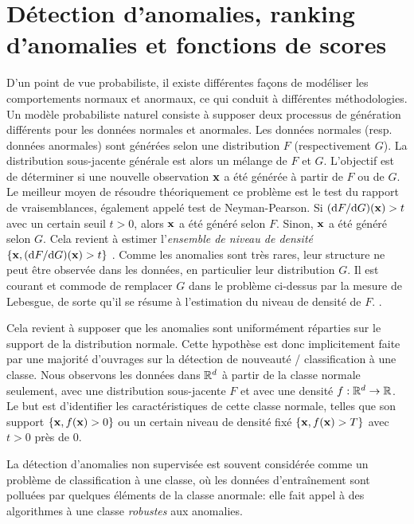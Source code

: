 \section{Détection d'anomalies, ranking d'anomalies et fonctions de scores}
\label{resume_fr:scoring_function}
D'un point de vue probabiliste, il existe différentes façons de modéliser les comportements normaux et anormaux, ce qui conduit à différentes méthodologies. Un modèle probabiliste naturel consiste à supposer deux processus de génération différents pour les données normales et anormales. Les données normales (resp. données anormales) sont générées selon une distribution $F$ (respectivement $G$). La distribution sous-jacente générale est alors un mélange de $F$ et $G$. L'objectif est de déterminer si une nouvelle observation $ \mathbf x $ a été générée à partir de $ F $ ou de $ G $. Le meilleur moyen de résoudre théoriquement ce problème est le test du rapport de vraisemblances, également appelé test de Neyman-Pearson. Si $ (\mathrm{d} F / \mathrm{d} G) (\mathbf x)> t $ avec un certain seuil $ t> 0 $, alors $ \mathbf x $ a été généré selon $ F $. Sinon, $ \mathbf x $ a été généré selon $G$. Cela revient à estimer l'\emph{ensemble de niveau de densité} $ \{\mathbf x, (\mathrm{d} F / \mathrm{d} G) (\mathbf x)> t \} $ \citep{Scholkopf2001, Steinwart2005, Scott2006, VertVert}.
%
Comme les anomalies sont très rares, leur structure ne peut être observée dans les données, en particulier leur distribution $ G $.
%
Il est courant et commode de remplacer $ G $ dans le problème ci-dessus par la mesure de Lebesgue, de sorte qu'il se résume à l'estimation du niveau de densité de $ F $.
\citep{Scholkopf2001, Scott2006, VertVert}.

Cela revient à supposer que les anomalies sont uniformément réparties sur le support de la distribution normale. %
Cette hypothèse est donc implicitement faite par une majorité d'ouvrages sur la détection de nouveauté / classification à une classe.
%
Nous observons les données dans $ \mathbb{R} ^ d $ à partir de la classe normale seulement, avec une distribution sous-jacente $ F $ et avec une densité $ f: \mathbb{R} ^ d \to \mathbb{R} $.
Le but est d'identifier les caractéristiques de cette classe normale, telles que son support $ \{\mathbf x, f (\mathbf x)> 0 \} $ ou un certain niveau de densité fixé $ \{\mathbf x, f (\mathbf x )> T \} $ avec $ t> 0 $ près de $ 0 $.

La détection d'anomalies non supervisée est souvent considérée comme un problème de classification à une classe, où les données d'entraînement sont polluées par quelques éléments de la classe anormale: elle fait appel à des algorithmes à une classe \emph{robustes} aux anomalies.

